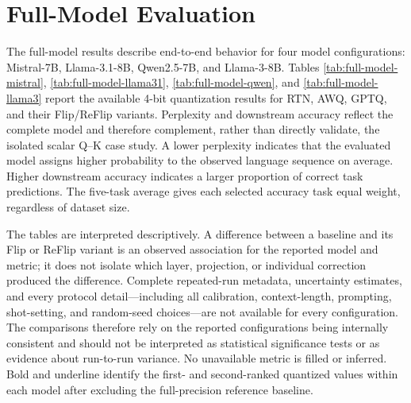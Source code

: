 \documentclass[../main.tex]{subfiles}
\begin{document}
\section{Full-Model Evaluation}

The full-model results describe end-to-end behavior for four model configurations: Mistral-7B, Llama-3.1-8B, Qwen2.5-7B, and Llama-3-8B. Tables \ref{tab:full-model-mistral}, \ref{tab:full-model-llama31}, \ref{tab:full-model-qwen}, and \ref{tab:full-model-llama3} report the available 4-bit quantization results for RTN, AWQ, GPTQ, and their Flip/ReFlip variants. Perplexity and downstream accuracy reflect the complete model and therefore complement, rather than directly validate, the isolated scalar Q--K case study. A lower perplexity indicates that the evaluated model assigns higher probability to the observed language sequence on average. Higher downstream accuracy indicates a larger proportion of correct task predictions. The five-task average gives each selected accuracy task equal weight, regardless of dataset size.

The tables are interpreted descriptively. A difference between a baseline and its Flip or ReFlip variant is an observed association for the reported model and metric; it does not isolate which layer, projection, or individual correction produced the difference. Complete repeated-run metadata, uncertainty estimates, and every protocol detail---including all calibration, context-length, prompting, shot-setting, and random-seed choices---are not available for every configuration. The comparisons therefore rely on the reported configurations being internally consistent and should not be interpreted as statistical significance tests or as evidence about run-to-run variance. No unavailable metric is filled or inferred. Bold and underline identify the first- and second-ranked quantized values within each model after excluding the full-precision reference baseline.
\end{document}
